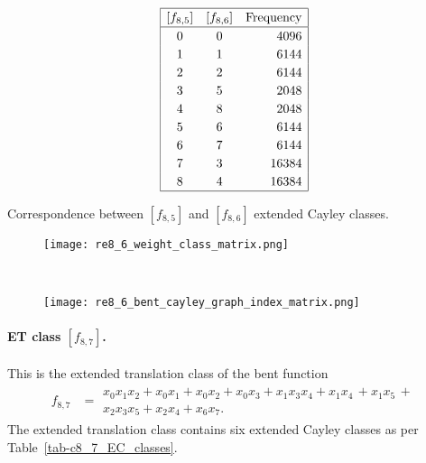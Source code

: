 \documentclass[12pt,a4paper]{article}
\begin{document}
\begin{table}[!bhpt] %
%
\small{}
\begin{align*}
\def\arraystretch{1.2}
\begin{array}{|ccr|}
\hline
[f_{8,5}] &
[f_{8,6}] &
\text{Frequency}
\\
\hline
  0 &    0 &  4096
\\
  1 &    1 &  6144
\\
  2 &    2 &  6144
\\
  3 &    5 &  2048
\\
  4 &    8 &  2048
\\
  5 &    6 &  6144
\\
  6 &    7 &  6144
\\
  7 &    3 & 16384
\\
  8 &    4 & 16384
\\
\hline
\end{array}
\end{align*}
\caption{Correspondence between $[f_{8,5}]$ and $[f_{8,6}]$ extended Cayley classes.}
\label{tab-c8_5-c8_6_EC_classes}
\end{table}

\begin{figure}[!bhpt] %
\centering
\begin{minipage}{.48\textwidth}
  \centering
  \texttt{[image: re8\_6\_weight\_class\_matrix.png]}
  \label{fig:c8_6_weight_class_matrix}
\end{minipage}%
~~~~
\begin{minipage}{.48\textwidth}
  \centering
  \texttt{[image: re8\_6\_bent\_cayley\_graph\_index\_matrix.png]}
  \label{fig:c8_6_bent_cayley_graph_index_matrix}
\end{minipage}
\end{figure}
\paragraph*{ET class $[f_{8,7}]$.}
%
This is the extended translation class of the bent function
\small{}
\begin{align*}
f_{ 8 , 7 } &=
\begin{array}{l}
x_{0} x_{1} x_{2} + x_{0} x_{1} + x_{0} x_{2} + x_{0} x_{3} + x_{1} x_{3} x_{4} + x_{1} x_{4}\, +
x_{1} x_{5}\, +
\\
x_{2} x_{3} x_{5} + x_{2} x_{4} + x_{6} x_{7}.
\end{array}
\end{align*}
\normalsize{}
The extended translation class contains six extended Cayley classes as per Table~\ref{tab-c8_7_EC_classes}.
\end{document}
